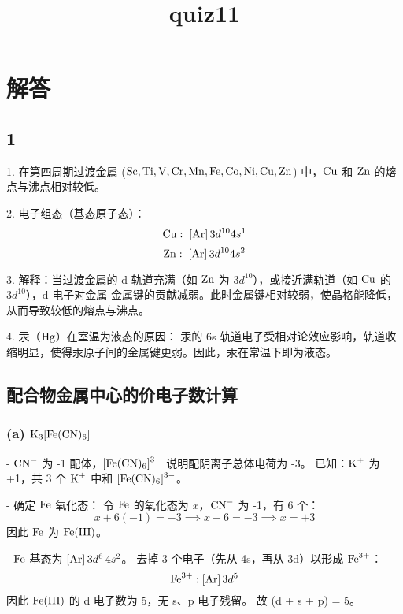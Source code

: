 \documentclass[12pt]{article}
\title{quiz11}
\author{}
\date{}
\begin{document}
	
	\maketitle
	
	\section*{解答}
	
	\subsection*{1}
	
	1. 在第四周期过渡金属 (\(\ce{Sc, Ti, V, Cr, Mn, Fe, Co, Ni, Cu, Zn}\)) 中，\(\ce{Cu}\) 和 \(\ce{Zn}\) 的熔点与沸点相对较低。
	
	2. 电子组态（基态原子态）：
	\[
	\ce{Cu}:\; [\ce{Ar}]\,3d^{10}4s^1
	\]
	\[
	\ce{Zn}:\; [\ce{Ar}]\,3d^{10}4s^2
	\]
	
	3. 解释：当过渡金属的 \(\mathrm{d}\)-轨道充满（如 \(\ce{Zn}\) 为 \(3d^{10}\)），或接近满轨道（如 \(\ce{Cu}\) 的 \(3d^{10}\)），\(\mathrm{d}\) 电子对金属-金属键的贡献减弱。此时金属键相对较弱，使晶格能降低，从而导致较低的熔点与沸点。
	
	4. 汞（\(\ce{Hg}\)）在室温为液态的原因：  
	汞的 6s 轨道电子受相对论效应影响，轨道收缩明显，使得汞原子间的金属键更弱。因此，汞在常温下即为液态。
	
	\subsection*{配合物金属中心的价电子数计算}
	
	\subsubsection*{(a) \(\ce{K3[Fe(CN)6]}\)}
	
	- \(\ce{CN^-}\) 为 -1 配体，\(\ce{[Fe(CN)6]^3-}\) 说明配阴离子总体电荷为 -3。  
	已知：\(\ce{K+}\) 为 +1，共 3 个 \(\ce{K+}\) 中和 \(\ce{[Fe(CN)6]^3-}\)。
	
	- 确定 \(\ce{Fe}\) 氧化态：  
	令 \(\ce{Fe}\) 的氧化态为 \(x\)，\(\ce{CN^-}\) 为 -1，有 6 个：  
	\[
	x + 6(-1) = -3 \implies x - 6 = -3 \implies x = +3
	\]
	因此 \(\ce{Fe}\) 为 \(\ce{Fe(III)}\)。
	
	- \(\ce{Fe}\) 基态为 \([ \ce{Ar}]\,3d^6\,4s^2\)。  
	去掉 3 个电子（先从 4s，再从 3d）以形成 \(\ce{Fe^{3+}}\)：  
	\[
	\ce{Fe^{3+}}: [\ce{Ar}]\,3d^5
	\]
	因此 \(\ce{Fe(III)}\) 的 d 电子数为 5，无 s、p 电子残留。  
	故 (d + s + p) = 5。
	
\end{document}
